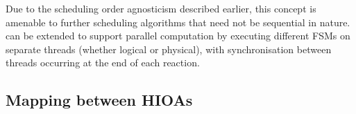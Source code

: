 Due to the scheduling order agnosticism described earlier, this concept is 
amenable to further scheduling algorithms that need not be sequential in 
nature.  \ourTool can be extended to support parallel computation by executing 
different \acp{FSM} on separate threads (whether logical or physical), with 
synchronisation between threads occurring at the end of each reaction.

\subsection{Mapping between \acp{HIOA}}
\label{sec:mapping}

